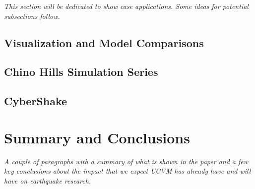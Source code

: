 \textit{
\color{blue}
This section will be dedicated to show case applications. Some ideas for potential subsections follow.
}

\subsection{Visualization and Model Comparisons}

\subsection{Chino Hills Simulation Series}

\subsection{CyberShake}

\section{Summary and Conclusions}
\label{sec:conclusions}

\textit{
\color{blue}
A couple of paragraphs with a summary of what is shown in the paper and a few key conclusions about the impact that we expect UCVM has already have and will have on earthquake research.
}

